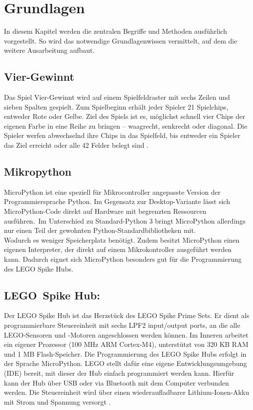 \chapter{Grundlagen}
In diesem Kapitel werden die zentralen Begriffe und Methoden ausführlich vorgestellt. So wird das notwendige Grundlagenwissen vermittelt, auf dem die weitere Ausarbeitung aufbaut.

\section{Vier-Gewinnt}
Das Spiel Vier-Gewinnt wird auf einem Spielfeldraster mit sechs Zeilen und sieben Spalten gespielt. Zum Spielbeginn erhält jeder Spieler 21 Spielchips, entweder Rote oder Gelbe. Ziel des Spiels ist es, möglichst schnell vier Chips der eigenen Farbe in eine Reihe zu bringen – waagrecht, senkrecht oder diagonal. Die Spieler werfen abwechselnd ihre Chips in das Spielfeld, bis entweder ein Spieler das Ziel erreicht oder alle 42 Felder belegt sind \autocite{Hasbro.2020}.

\section{Mikropython}
MicroPython ist eine speziell für Mikrocontroller angepasste Version der Programmiersprache Python. Im Gegensatz zur Desktop-Variante lässt sich MicroPython-Code direkt auf Hardware mit begrenzten Ressourcen ausführen\autocite{energy_responsiveness2023}\autocite{Plauska2023}.\
Im Unterschied zu Standard-Python 3 bringt MicroPython allerdings nur einen Teil der gewohnten Python-Standardbibliotheken mit.\\ Wodurch es weniger Speicherplatz benötigt.
Zudem besitzt MicroPython einen eigenen Interpreter, der direkt auf einem Mikrokontroller ausgeführt werden kann.
Dadurch eignet sich MicroPython besonders gut für die Programmierung des LEGO Spike Hubs\autocite{bell2024micropython}.



\section{LEGO Spike Hub:}
Der LEGO Spike Hub ist das Herzstück des LEGO Spike Prime Sets. Er dient als programmierbare Steuereinheit mit sechs LPF2 input/output ports, an die alle LEGO-Sensoren und -Motoren angeschlossen werden können. Im Inneren arbeitet ein eigener Prozessor (100 MHz ARM Cortex-M4), unterstützt von 320 KB RAM und 1 MB Flash-Speicher. Die Programmierung des LEGO Spike Hubs erfolgt in der Sprache MicroPython. LEGO stellt dafür eine eigene Entwicklungsumgebung (IDE) bereit, mit dieser der Hub einfach programmiert werden kann. Hierfür kann der Hub über USB oder via Bluetooth mit dem Computer verbunden werden. Die Steuereinheit wird über einen  wiederaufladbarer Lithium-Ionen-Akku mit Strom und Spannung versorgt \autocite{lego2020techniclargehub}.

